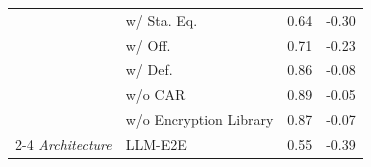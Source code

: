 \begin{table}[!t]
\begin{tabular}{m{2.5cm}m{3cm}m{0.7cm}m{0.8cm}}
            & w/ Sta. Eq. & 0.64 & -0.30 \\
            & w/ Off. & 0.71 & -0.23 \\ 
            & w/ Def. & 0.86 & -0.08 \\ 
            & w/o CAR & 0.89 & -0.05 \\ 
            & w/o Encryption Library & 0.87 & -0.07 \\ 
            \cmidrule(lr){2-4}
            \textit{Architecture}
            & LLM-E2E & 0.55 & -0.39 \\
            \bottomrule
            \end{tabular} 
\end{table}%
